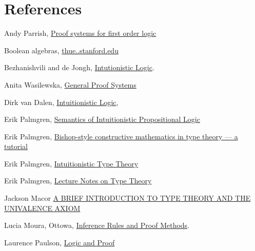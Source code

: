 
\section{References}


\begin{thebibliography}




 Andy Parrish, \href{https://www.math.ucsd.edu/~sbuss/CourseWeb/Math260_2012WS/Feb10Parrish.pdf}{Proof systems for first order logic}

 Boolean algebras, \href{http://thue.stanford.edu/bool.html}{thue..stanford.edu}

 Bezhanishvili and de Jongh,  \href{https://www.illc.uva.nl/Research/Publications/Reports/PP-2006-25.text.pdf}{Intutionistic Logic}. 

 Anita Wasilewska, \href{https://www3.cs.stonybrook.edu/~cse541/chapter7.pdf}{General Proof Systems}

 Dirk van Dalen,  \href{https://pdfs.semanticscholar.org/1e75/6d625d4cf2d91f69149b3d5a1f2d07fe4b2f.pdf}{Intuitionistic Logic}, 

 Erik Palmgren, \href{http://www2.math.uu.se/~palmgren/tillog/heyting3.pdf}{Semantics of Intuitionistic Propositional Logic}

 Erik Palmgren, \href{http://staff.math.su.se/palmgren/Palmgren_Nis.pdf}{Bishop-style constructive mathematics in type theory — a tutorial}

 Erik Palmgren, \href{http://www.cse.chalmers.se/~peterd/papers/IntuitionisticTypeTheory150505.pdf}{Intuitionistic Type Theory}

 Erik Palmgren, \href{http://staff.math.su.se/palmgren/lecturenotesTT.pdf}{Lecture Notes on Type Theory}

 Jackson Macor \href{https://math.uchicago.edu/~may/REU2015/REUPapers/Macor.pdf}{A  BRIEF  INTRODUCTION  TO  TYPE  THEORY  AND  THE
UNIVALENCE  AXIOM}

 Lucia Moura, Ottowa, \href{https://www.site.uottawa.ca/~lucia/courses/2101-10/lecturenotes/04InferenceRulesProofMethods.pdf}{Inference Rules and Proof Methods}.  

 Laurence Paulson, \href{https://www.cl.cam.ac.uk/teaching/1112/LogicProof/logic-notes.pdf}{Logic and Proof}


\end{thebibliography}
